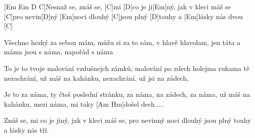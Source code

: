 
[Em Em D C]\null
[Em]Nesnaž se, znáš se, 
[C] mi [D]co je ji[Em]ný, jak v kleci máš se [C]pro nevin[D]ný
[Em]noci dlouhý [C]jsou plný [D]touhy a [Em]lásky nás dvou [C]

Všechno hezký za sebou mám, 
můžu si za to  sám, v hlavě hlavolam,
jen táta a máma jsou s náma, napořád s náma  

To je to tvoje malování vzdušnejch zámků, 
malování po zdech holejma rukama
tě nezachrání, už máš na kahánku, 
nezachrání, už jsi na zádech,

Je to za náma, ty čteš poslední stránku, 
za náma, na zádech, za náma,
už máš na kahánku, mezi náma, 
mi taky [Am Hm]došel dech.....

Znáš se,  mi co je jiný, 
jak v kleci máš se, pro nevinný
noci dlouhý jsou plný touhy a lásky nás tří.
\columnbreak